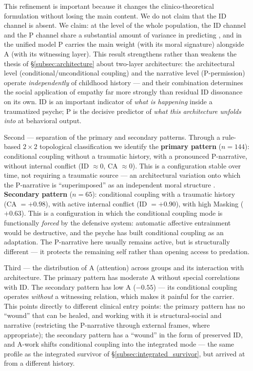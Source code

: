 This refinement is important because it changes the clinico-theoretical formulation without losing the main content. We do not claim that the ID channel is absent. We claim: at the level of the whole population, the ID channel and the P channel share a substantial amount of variance in predicting \EAF{}, and in the unified model P carries the main weight (with its moral signature) alongside A (with its witnessing layer). This result strengthens rather than weakens the thesis of §\ref{subsec:architecture} about two-layer architecture: the architectural level (conditional/unconditional coupling) and the narrative level (P-permission) operate \emph{independently} of childhood history --- and their combination determines the social application of empathy far more strongly than residual ID dissonance on its own. ID is an important indicator of \emph{what is happening} inside a traumatized psyche; P is the decisive predictor of \emph{what this architecture unfolds into} at behavioral output.

Second --- separation of the primary and secondary patterns. Through a rule-based $2\times 2$ topological classification we identify the \textbf{primary pattern} ($n = 144$): conditional coupling without a traumatic history, with a pronounced P-narrative, without internal conflict (ID $\approx 0$, CA $\approx 0$). This is a configuration stable over time, not requiring a traumatic source --- an architectural variation onto which the P-narrative is ``superimposed'' as an independent moral structure \citep[in the terms of][empirically --- in similar proportions in \citealp{lilienfeld1990, patrick2010}]{karpman1941}. \textbf{Secondary pattern} ($n = 65$): conditional coupling with a traumatic history (CA $= +0.98$), with active internal conflict (ID $= +0.90$), with high Masking ($+0.63$). This is a configuration in which the conditional coupling mode is functionally \emph{forced} by the defensive system: automatic affective entrainment would be destructive, and the psyche has built conditional coupling as an adaptation. The P-narrative here usually remains active, but is structurally different --- it protects the remaining self rather than opening access to predation.

Third --- the distribution of A (attention) across groups and its interaction with architecture. The primary pattern has moderate A without special correlations with ID. The secondary pattern has low A ($-0.55$) --- its conditional coupling operates \emph{without} a witnessing relation, which makes it painful for the carrier. This points directly to different clinical entry points: the primary pattern has no ``wound'' that can be healed, and working with it is structural-social and narrative (restricting the P-narrative through external frames, where appropriate); the secondary pattern has a ``wound'' in the form of preserved ID, and A-work shifts conditional coupling into the integrated mode --- the same profile as the integrated survivor of §\ref{subsec:integrated_survivor}, but arrived at from a different history.


